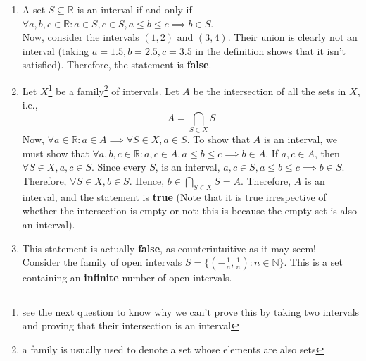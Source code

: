 \documentclass{article}
\begin{document}
\begin{enumerate}
	\item A set $S \subseteq \mathbb{R}$ is an interval if and only if $\forall a, b, c \in \mathbb{R}: a \in S, c \in S, a \leq b \leq c \implies b \in S$.
	\\Now, consider the intervals $(1, 2)$ and $(3, 4)$. Their union is clearly not an interval (taking $a = 1.5, b = 2.5, c = 3.5$ in the definition shows that it isn't satisfied). Therefore, the statement is \textbf{false}.
	\item Let $X$\footnote[1]{see the next question to know why we can't prove this by taking two intervals and proving that their intersection is an interval} be a family\footnote[2]{a family is usually used to denote a set whose elements are also sets} of intervals. Let $A$ be the intersection of all the sets in $X$, i.e.,
	\begin{equation*}
		A = \bigcap_{S \in X} S
	\end{equation*}
	Now, $\forall a \in \mathbb{R}: a \in A \implies \forall S \in X, a \in S$. To show that $A$ is an interval, we must show that $\forall a, b, c \in \mathbb{R}: a, c \in A, a \leq b \leq c \implies b \in A$.
	If $a, c \in A$, then $\forall S \in X, a, c \in S$. Since every $S$, is an interval, $a, c \in S, a \leq b \leq c \implies b \in S$. Therefore, $\forall S \in X, b \in S$.
	Hence, $b \in \bigcap_{S \in X} S = A$. Therefore, $A$ is an interval, and the statement is \textbf{true} (Note that it is true irrespective of whether the intersection is empty or not: this is because the empty set is also an interval).
	\item This statement is actually \textbf{false}, as counterintuitive as it may seem!\\
	Consider the family of open intervals $S = \{(-\frac{1}{n}, \frac{1}{n}) : n \in \mathbb{N}\}$. This is a set containing an \textbf{infinite} number of open intervals.

\end{enumerate}
\end{document}
